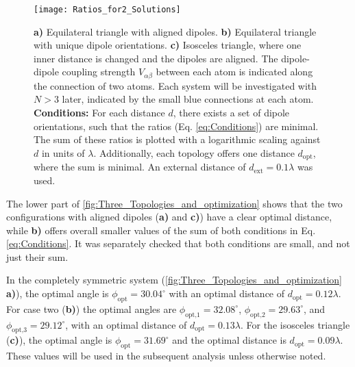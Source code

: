 \begin{figure}
    \centering
    \texttt{[image: Ratios\_for2\_Solutions]}
    \caption{\textbf{a)} Equilateral triangle with aligned dipoles.
    \textbf{b)} Equilateral triangle with unique dipole orientations.
    \textbf{c)} Isosceles triangle, where one inner distance is changed and the dipoles are aligned.
    The dipole-dipole coupling strength $ V_{\alpha \beta} $ between each atom is indicated along the connection of two atoms.
    Each system will be investigated with $ N > 3 $ later, indicated by the small blue connections at each atom.
    \textbf{Conditions: }
    For each distance $ d $, there exists a set of dipole orientations,
        such that the ratios (Eq.
        \ref{eq:Conditions}) are minimal.
    The sum of these ratios is plotted with a logarithmic scaling against $ d $ in units of $\lambda$.
    Additionally, each topology offers one distance $ d_{\text{opt}} $, where the sum is minimal.
    An external distance of $ d_{\text{ext}} = 0.1 \lambda $ was used.}
    \label{fig:Three_Topologies_and_optimization}
\end{figure}

\noindent
The lower part of \autoref{fig:Three_Topologies_and_optimization} shows
that the two configurations with aligned dipoles (\textbf{a)} and \textbf{c)}) have a clear optimal distance, while
\textbf{b)} offers overall smaller values of the sum of both conditions in Eq. \eqref{eq:Conditions}.
It was separately checked that both conditions are small, and not just their sum.

\noindent
In the completely symmetric system (\autoref{fig:Three_Topologies_and_optimization} \textbf{a)}), the optimal angle is \(\phi_{\text{opt}} = 30.04^\circ\) with an optimal distance of \(d_{\text{opt}} = 0.12\lambda\).
For case two (\textbf{b)}) the optimal angles are \(\phi_{\text{opt,1}} = 32.08^\circ\), \(\phi_{\text{opt,2}} = 29.63^\circ\), and \(\phi_{\text{opt,3}} = 29.12^\circ\), with an optimal distance of \(d_{\text{opt}} = 0.13\lambda\).
For the isosceles triangle (\textbf{c)}), the optimal angle is \(\phi_{\text{opt}} = 31.69^\circ\) and the optimal distance is \(d_{\text{opt}} = 0.09\lambda\).
These values will be used in the subsequent analysis unless otherwise noted.




